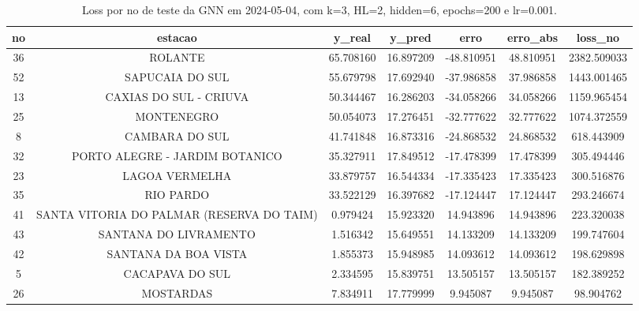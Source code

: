 \begin{table}[h]
\centering
\caption{Loss por no de teste da GNN em 2024-05-04, com k=3, HL=2, hidden=6, epochs=200 e lr=0.001.}
\label{tab:gnn_loss_k3_hl2_h6_e200_d20240504}
\begin{tabular}{ccccccc}
\toprule
no & estacao & y\_real & y\_pred & erro & erro\_abs & loss\_no \\
\midrule
36 & ROLANTE & 65.708160 & 16.897209 & -48.810951 & 48.810951 & 2382.509033 \\
52 & SAPUCAIA DO SUL & 55.679798 & 17.692940 & -37.986858 & 37.986858 & 1443.001465 \\
13 & CAXIAS DO SUL - CRIUVA & 50.344467 & 16.286203 & -34.058266 & 34.058266 & 1159.965454 \\
25 & MONTENEGRO & 50.054073 & 17.276451 & -32.777622 & 32.777622 & 1074.372559 \\
8 & CAMBARA DO SUL & 41.741848 & 16.873316 & -24.868532 & 24.868532 & 618.443909 \\
32 & PORTO ALEGRE - JARDIM BOTANICO & 35.327911 & 17.849512 & -17.478399 & 17.478399 & 305.494446 \\
23 & LAGOA VERMELHA & 33.879757 & 16.544334 & -17.335423 & 17.335423 & 300.516876 \\
35 & RIO PARDO & 33.522129 & 16.397682 & -17.124447 & 17.124447 & 293.246674 \\
41 & SANTA VITORIA DO PALMAR (RESERVA DO TAIM) & 0.979424 & 15.923320 & 14.943896 & 14.943896 & 223.320038 \\
43 & SANTANA DO LIVRAMENTO & 1.516342 & 15.649551 & 14.133209 & 14.133209 & 199.747604 \\
42 & SANTANA DA BOA VISTA & 1.855373 & 15.948985 & 14.093612 & 14.093612 & 198.629898 \\
5 & CACAPAVA DO SUL & 2.334595 & 15.839751 & 13.505157 & 13.505157 & 182.389252 \\
26 & MOSTARDAS & 7.834911 & 17.779999 & 9.945087 & 9.945087 & 98.904762 \\
\bottomrule
\end{tabular}
\end{table}
